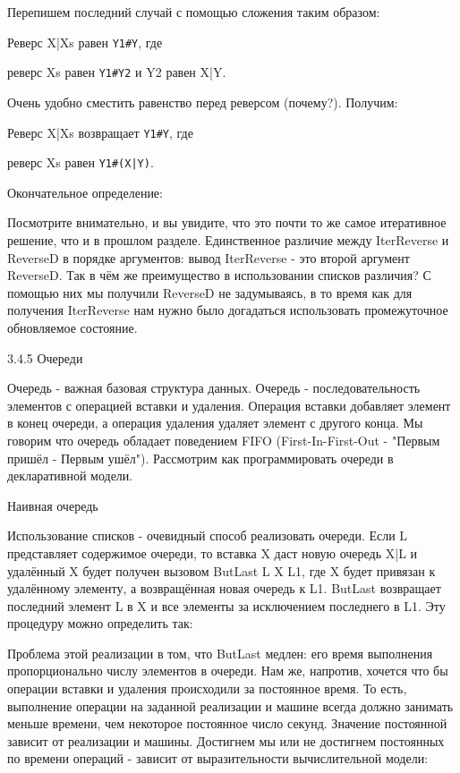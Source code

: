 Перепишем последний случай с помощью сложения таким образом:

Реверс X|Xs равен \verb|Y1#Y|, где

реверс Xs равен \verb|Y1#Y2| и
Y2 равен X|Y.

Очень удобно сместить равенство перед реверсом (почему?). Получим:

Реверс X|Xs возвращает \verb|Y1#Y|, где

реверс Xs равен \verb!Y1#(X|Y)!.

Окончательное определение:

Посмотрите внимательно, и вы увидите, что это почти то же самое итеративное решение, что и в прошлом разделе. Единственное различие между IterReverse и ReverseD в порядке аргументов: вывод IterReverse - это второй аргумент ReverseD. Так в чём же преимущество в использовании списков различия? С помощью них мы получили ReverseD не задумываясь, в то время как для получения IterReverse нам нужно было догадаться использовать промежуточное обновляемое состояние.

3.4.5 Очереди

Очередь - важная базовая структура данных. Очередь - последовательность элементов с операцией вставки и удаления. Операция вставки добавляет элемент в конец очереди, а операция удаления удаляет элемент с другого конца. Мы говорим что очередь обладает поведением FIFO (First-In-First-Out - "Первым пришёл - Первым ушёл"). Рассмотрим как программировать очереди в декларативной модели.

Наивная очередь

Использование списков - очевидный способ реализовать очереди. Если L представляет содержимое очереди, то вставка X даст новую очередь X|L и удалённый X будет получен вызовом {ButLast L X L1}, где X будет привязан к удалённому элементу, а возвращённая новая очередь к L1. ButLast возвращает последний элемент L в X и все элементы за исключением последнего в L1. Эту процедуру можно определить так:

Проблема этой реализации в том, что ButLast медлен: его время выполнения пропорционально числу элементов в очереди. Нам же, напротив, хочется что бы операции вставки и удаления происходили за постоянное время. То есть, выполнение операции на заданной реализации и машине всегда должно занимать меньше времени, чем некоторое постоянное число секунд. Значение постоянной зависит от реализации и машины. Достигнем мы или не достигнем постоянных по времени операций - зависит от выразительности вычислительной модели:

